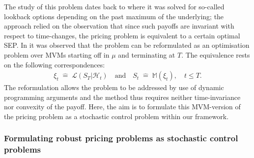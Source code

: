 \documentclass{article}
\theoremstyle{definition}
\numberwithin{equation}{section}
\numberwithin{theorem}{section}
\newcommand{\Lc}{\mathcal{L}}
\newcommand{\Hc}{\mathcal{H}}
\newcommand{\Mb}{\mathbb{M}}
\begin{document}
	The study of this problem dates back to \cite{hobson1998} where it was solved for so-called lookback options depending on the past maximum of the underlying; the approach relied on the observation that since such payoffs are invariant with respect to time-changes, the pricing problem is equivalent to a certain optimal SEP. 
	 In \cite{cox2017} it was observed that the problem can be reformulated as an optimisation problem over MVMs starting off in $\mu$ and terminating at $T$. The equivalence rests on the following correspondences: 
	\begin{align*}
		\xi_t\;\widehat=\;\Lc(S_T|\Hc_t)
		\quad\textrm{and}\quad
		S_t\;\widehat=\;\Mb(\xi_t),
		\quad t\le T.
	\end{align*}
	The reformulation allows the problem to be addressed by use of dynamic programming arguments and the method thus requires neither time-invariance nor convexity of the payoff. 
	Here, the aim is to formulate this MVM-version of the pricing problem as a stochastic control problem within our framework. 
	
		
	

	
	
	\subsubsection*{Formulating robust pricing problems as stochastic control problems}
	
\end{document}

